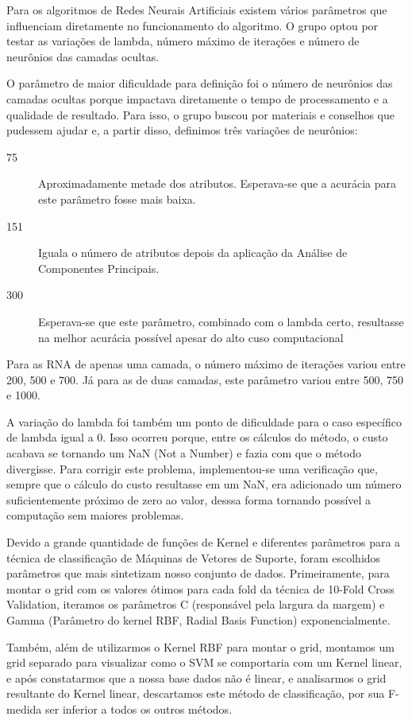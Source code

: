 \documentclass[10pt, conference, compsocconf]{IEEEtran}
\begin{document}
Para os algoritmos de Redes Neurais Artificiais existem vários parâmetros que
influenciam diretamente no funcionamento do algoritmo. O grupo optou por testar
as variações de lambda, número máximo de iterações e número de neurônios das
camadas ocultas. 

O parâmetro de maior dificuldade para definição foi o número de
neurônios das camadas ocultas porque impactava diretamente o tempo de
processamento e a qualidade de resultado. Para isso, o grupo buscou por
materiais e conselhos que pudessem ajudar e, a partir disso, definimos três
variações de neurônios: 
    \begin{description}
        \item[75]{Aproximadamente metade dos atributos. Esperava-se que a
        acurácia para este parâmetro fosse mais baixa.}
        \item[151]{Iguala o número de atributos depois da aplicação da Análise
        de Componentes Principais.}
        \item[300]{Esperava-se que este parâmetro, combinado com o lambda certo,
        resultasse na melhor acurácia possível apesar do alto cuso
        computacional}
    \end{description}

Para as RNA de apenas uma camada, o número máximo de iterações variou entre 200,
500 e 700. Já para as de duas camadas, este parâmetro variou entre 500, 750 e
1000.

A variação do lambda foi também um ponto de dificuldade para o caso específico
de lambda igual a 0. Isso ocorreu porque, entre os cálculos do método, o custo
acabava se tornando um NaN (Not a Number) e fazia com que o método divergisse.
Para corrigir este problema, implementou-se uma verificação que, sempre que o
cálculo do custo resultasse em um NaN, era adicionado um número suficientemente
próximo de zero ao valor, desssa forma tornando possível a computação sem
maiores problemas.


Devido a grande quantidade de funções de Kernel e diferentes parâmetros para a técnica de classificação de Máquinas de Vetores de Suporte, foram escolhidos parâmetros que mais sintetizam nosso conjunto de dados. Primeiramente, para montar o grid com os valores ótimos para cada fold da técnica de 10-Fold Cross Validation, iteramos os parâmetros C (responsável pela largura da margem) e Gamma (Parâmetro do kernel RBF, Radial Basis Function) exponencialmente.

Também, além de utilizarmos o Kernel RBF para montar o grid, montamos um grid separado para visualizar como o SVM se comportaria com um Kernel linear, e após constatarmos que a nossa base dados não é linear, e analisarmos o grid resultante do Kernel linear, descartamos este método de classificação, por sua F-medida ser inferior a todos os outros métodos.
\end{document}
